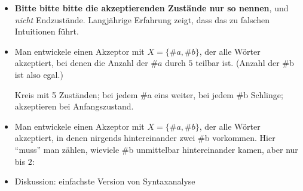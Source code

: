 \begin{extract}[tut]
  \begin{itemize}
  \item \textbf{Bitte bitte bitte die akzeptierenden Zustände nur so
      nennen}, und \emph{nicht} Endzustände. Langjährige Erfahrung
    zeigt, dass das zu falschen Intuitionen führt.
  \item Man entwickele einen Akzeptor mit $X=\{\#a,\#b\}$, der alle
    Wörter akzeptiert, bei denen die Anzahl der $\#a$ durch $5$
    teilbar ist. (Anzahl der \#b ist also egal.)
    
    Kreis mit 5 Zuständen; bei jedem \#a eins weiter, bei jedem \#b
    Schlinge; akzeptieren bei Anfangszustand.
  \item Man entwickele einen Akzeptor mit $X=\{\#a,\#b\}$, der alle
    Wörter akzeptiert, in denen nirgends hintereinander zwei \#b
    vorkommen. Hier "`muss"' man zählen, wieviele \#b unmittelbar
    hintereinander kamen, aber nur bis $2$:

  \item Diskussion: einfachste Version von Syntaxanalyse
  \end{itemize}
\end{extract}

